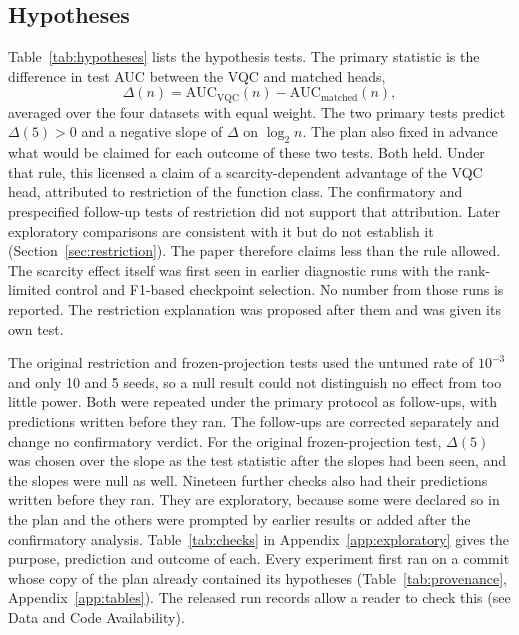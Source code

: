 \documentclass{ieeeaccess}
\newcommand{\vqc}{VQC}
\begin{document}
\subsection{Hypotheses}
\label{sec:prespec}
Table~\ref{tab:hypotheses} lists the hypothesis tests. The primary statistic is the difference in test AUC between the \vqc{} and matched heads,
\begin{equation}
\Delta(n)=\mathrm{AUC}_{\mathrm{VQC}}(n)-\mathrm{AUC}_{\mathrm{matched}}(n),
\label{eq:delta}
\end{equation}
averaged over the four datasets with equal weight. The two primary tests predict $\Delta(5)>0$ and a negative slope of $\Delta$ on $\log_2 n$. The plan also fixed in advance what would be claimed for each outcome of these two tests. Both held. Under that rule, this licensed a claim of a scarcity-dependent advantage of the \vqc{} head, attributed to restriction of the function class. The confirmatory and prespecified follow-up tests of restriction did not support that attribution. Later exploratory comparisons are consistent with it but do not establish it (Section~\ref{sec:restriction}). The paper therefore claims less than the rule allowed. The scarcity effect itself was first seen in earlier diagnostic runs with the rank-limited control and F1-based checkpoint selection. No number from those runs is reported. The restriction explanation was proposed after them and was given its own test.

The original restriction and frozen-projection tests used the untuned rate of $10^{-3}$ and only 10 and 5 seeds, so a null result could not distinguish no effect from too little power. Both were repeated under the primary protocol as follow-ups, with predictions written before they ran. The follow-ups are corrected separately and change no confirmatory verdict. For the original frozen-projection test, $\Delta(5)$ was chosen over the slope as the test statistic after the slopes had been seen, and the slopes were null as well. Nineteen further checks also had their predictions written before they ran. They are exploratory, because some were declared so in the plan and the others were prompted by earlier results or added after the confirmatory analysis. Table~\ref{tab:checks} in Appendix~\ref{app:exploratory} gives the purpose, prediction and outcome of each. Every experiment first ran on a commit whose copy of the plan already contained its hypotheses (Table~\ref{tab:provenance}, Appendix~\ref{app:tables}). The released run records allow a reader to check this (see Data and Code Availability).
\end{document}
